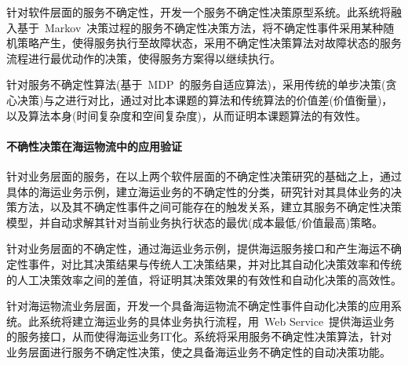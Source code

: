 针对软件层面的服务不确定性，开发一个服务不确定性决策原型系统。此系统将融入基于~Markov~决策过程的服务不确定性决策方法，将不确定性事件采用某种随机策略产生，使得服务执行至故障状态，采用不确定性决策算法对故障状态的服务流程进行最优动作的决策，使得服务方案得以继续执行。

针对服务不确定性算法(基于~MDP~的服务自适应算法)，采用传统的单步决策(贪心决策)与之进行对比，通过对比本课题的算法和传统算法的价值差(价值衡量)，以及算法本身(时间复杂度和空间复杂度)，从而证明本课题算法的有效性。

\paragraph{不确性决策在海运物流中的应用验证}

针对业务层面的服务，在以上两个软件层面的不确定性决策研究的基础之上，通过具体的海运业务示例，建立海运业务的不确定性的分类，研究针对其具体业务的决策方法，以及其不确定性事件之间可能存在的触发关系，建立其服务不确定性决策模型，并自动求解其针对当前业务执行状态的最优(成本最低/价值最高)策略。

针对业务层面的不确定性，通过海运业务示例，提供海运服务接口和产生海运不确定性事件，对比其决策结果与传统人工决策结果，并对比其自动化决策效率和传统的人工决策效率之间的差值，将证明其决策效果的有效性和自动化决策的高效性。

针对海运物流业务层面，开发一个具备海运物流不确定性事件自动化决策的应用系统。此系统将建立海运业务的具体业务执行流程，用~Web Service~提供海运业务的服务接口，从而使得海运业务IT化。系统将采用服务不确定性决策算法，针对业务层面进行服务不确定性决策，使之具备海运业务不确定性的自动决策功能。
